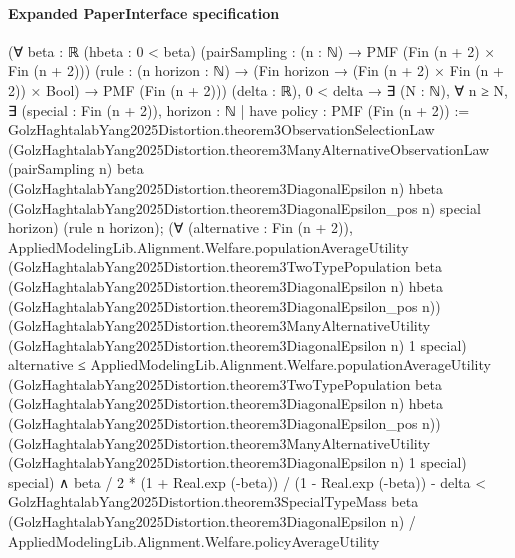 \documentclass[10pt]{article}
\begin{document}
\paragraph{Expanded PaperInterface specification}
\begin{ReviewVerbatim}
(∀ {beta : ℝ} (hbeta : 0 < beta) (pairSampling : (n : ℕ) → PMF (Fin (n + 2) × Fin (n + 2)))
    (rule : (n horizon : ℕ) → (Fin horizon → (Fin (n + 2) × Fin (n + 2)) × Bool) → PMF (Fin (n + 2))) (delta : ℝ),
    0 < delta →
      ∃ (N : ℕ),
        ∀ n ≥ N,
          ∃ (special : Fin (n + 2)),
            {horizon : ℕ |
                have policy : PMF (Fin (n + 2)) :=
                  GolzHaghtalabYang2025Distortion.theorem3ObservationSelectionLaw
                    (GolzHaghtalabYang2025Distortion.theorem3ManyAlternativeObservationLaw (pairSampling n) beta
                      (GolzHaghtalabYang2025Distortion.theorem3DiagonalEpsilon n) hbeta
                      (GolzHaghtalabYang2025Distortion.theorem3DiagonalEpsilon_pos n) special horizon)
                    (rule n horizon);
                (∀ (alternative : Fin (n + 2)),
                    AppliedModelingLib.Alignment.Welfare.populationAverageUtility
                        (GolzHaghtalabYang2025Distortion.theorem3TwoTypePopulation beta
                          (GolzHaghtalabYang2025Distortion.theorem3DiagonalEpsilon n) hbeta
                          (GolzHaghtalabYang2025Distortion.theorem3DiagonalEpsilon_pos n))
                        (GolzHaghtalabYang2025Distortion.theorem3ManyAlternativeUtility
                          (GolzHaghtalabYang2025Distortion.theorem3DiagonalEpsilon n) 1 special)
                        alternative ≤
                      AppliedModelingLib.Alignment.Welfare.populationAverageUtility
                        (GolzHaghtalabYang2025Distortion.theorem3TwoTypePopulation beta
                          (GolzHaghtalabYang2025Distortion.theorem3DiagonalEpsilon n) hbeta
                          (GolzHaghtalabYang2025Distortion.theorem3DiagonalEpsilon_pos n))
                        (GolzHaghtalabYang2025Distortion.theorem3ManyAlternativeUtility
                          (GolzHaghtalabYang2025Distortion.theorem3DiagonalEpsilon n) 1 special)
                        special) ∧
                  beta / 2 * (1 + Real.exp (-beta)) / (1 - Real.exp (-beta)) - delta <
                    GolzHaghtalabYang2025Distortion.theorem3SpecialTypeMass beta
                        (GolzHaghtalabYang2025Distortion.theorem3DiagonalEpsilon n) /
                      AppliedModelingLib.Alignment.Welfare.policyAverageUtility
}
\end{ReviewVerbatim}
\end{document}

